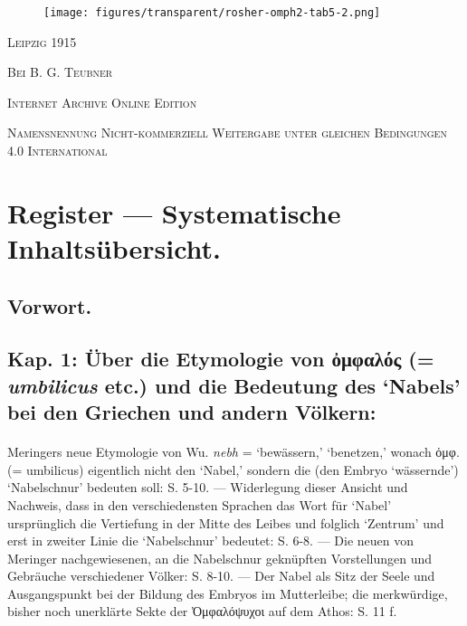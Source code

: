 \documentclass[a4paper, 11pt, oneside]{article}
\begin{document}
\begin{titlepage}
        \begin{figure}[H]
        \centering
        \texttt{[image: figures/transparent/rosher-omph2-tab5-2.png]}
        \end{figure}

	\vspace{1\baselineskip}

        \vspace*{\fill}

	{\small\scshape Leipzig 1915}
	
	{\small\scshape{Bei B. G. Teubner}}
 
	\vspace{0.5\baselineskip} %

        \scshape Internet Archive Online Edition  %
	
	{\scshape\small Namensnennung Nicht-kommerziell Weitergabe unter gleichen Bedingungen 4.0 International} %
\end{titlepage}
\setlength{\parskip}{1mm plus1mm minus1mm}
\clearpage
\Large
\tableofcontents
\clearpage
\section*{Register --- Systematische Inhaltsübersicht.}
\subsection*{Vorwort.}
\subsection*{Kap. 1: Über die Etymologie von ὀμφαλός (= \emph{umbilicus} etc.) und die Bedeutung des `Nabels' bei den Griechen und andern Völkern:}
\paragraph{}
Meringers neue Etymologie von Wu. \emph{nebh} = `bewässern,' `benetzen,' wonach ὀμφ. (= umbilicus) eigentlich nicht den `Nabel,' sondern die (den Embryo `wässernde') `Nabelschnur' bedeuten soll: S. 5-10. --- Widerlegung dieser Ansicht und Nachweis, dass in den verschiedensten Sprachen das Wort für `Nabel' ursprünglich die Vertiefung in der Mitte des Leibes und folglich `Zentrum' und erst in zweiter Linie die `Nabelschnur' bedeutet: S. 6-8. --- Die neuen von Meringer nachgewiesenen, an die Nabelschnur geknüpften Vorstellungen und Gebräuche verschiedener Völker: S. 8-10. --- Der Nabel als Sitz der Seele und Ausgangspunkt bei der Bildung des Embryos im Mutterleibe; die merkwürdige, bisher noch unerklärte Sekte der Ὀμφαλόψυχοι auf dem Athos: S. 11 f.
\end{document}
